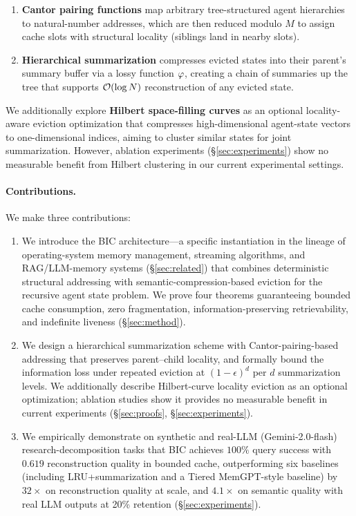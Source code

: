 \begin{enumerate}
  \item \textbf{Cantor pairing functions} map arbitrary tree-structured
        agent hierarchies to natural-number addresses, which are then
        reduced modulo $M$ to assign cache slots with structural
        locality (siblings land in nearby slots).
  \item \textbf{Hierarchical summarization} compresses evicted states
        into their parent's summary buffer via a lossy function
        $\varphi$, creating a chain of summaries up the tree that
        supports $\mathcal{O}(\log N)$ reconstruction of any evicted state.
\end{enumerate}

\noindent
We additionally explore \textbf{Hilbert space-filling curves} as an
optional locality-aware eviction optimization that compresses
high-dimensional agent-state vectors to one-dimensional indices,
aiming to cluster similar states for joint summarization.  However,
ablation experiments (\S\ref{sec:experiments}) show no measurable
benefit from Hilbert clustering in our current experimental settings.

\paragraph{Contributions.} We make three contributions:
\begin{enumerate}
  \item We introduce the BIC architecture---a specific instantiation
        in the lineage of operating-system memory management,
        streaming algorithms, and RAG/LLM-memory systems
        (\S\ref{sec:related}) that combines deterministic structural
        addressing with semantic-compression-based eviction for the
        recursive agent state problem.  We prove four theorems
        guaranteeing bounded cache consumption, zero fragmentation,
        information-preserving retrievability, and indefinite
        liveness (\S\ref{sec:method}).
  \item We design a hierarchical summarization scheme with
        Cantor-pairing-based addressing that preserves parent--child
        locality, and formally bound the information loss under
        repeated eviction at $(1-\epsilon)^d$ per $d$ summarization
        levels.  We additionally describe Hilbert-curve locality
        eviction as an optional optimization; ablation studies show
        it provides no measurable benefit in current experiments
        (\S\ref{sec:proofs}, \S\ref{sec:experiments}).
  \item We empirically demonstrate on synthetic and real-LLM
        (Gemini-2.0-flash) research-decomposition tasks that BIC
        achieves $100\%$ query success with $0.619$ reconstruction
        quality in bounded cache, outperforming six baselines
        (including LRU+summarization and a Tiered MemGPT-style
        baseline) by $32\times$ on reconstruction quality at scale,
        and $4.1\times$ on semantic quality with real LLM outputs
        at 20\% retention (\S\ref{sec:experiments}).
\end{enumerate}
